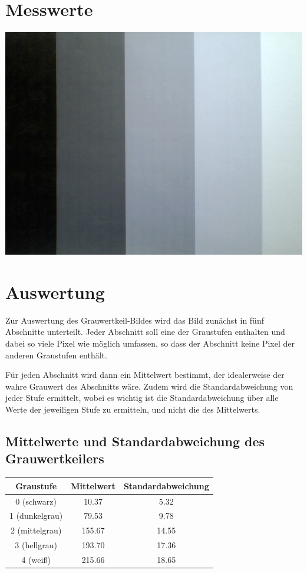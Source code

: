 \section{Messwerte}
\label{chap:VERSUCH_1_MESSWERTE}

\includegraphics[scale=0.7]{media/grauwertkeil/grauwertkeil.png}
\label{Fig:Grawertkeil}


\section{Auswertung}
\label{chap:VERSUCH_1_AUSWERTUNG}

Zur Auswertung des Grauwertkeil-Bildes wird das Bild zunächst in fünf Abschnitte unterteilt. Jeder Abschnitt soll eine der Graustufen enthalten und dabei so viele Pixel wie möglich umfassen, so dass der Abschnitt keine Pixel der anderen Graustufen enthält.

Für jeden Abschnitt wird dann ein Mittelwert bestimmt, der idealerweise der wahre Grauwert des Abschnitts wäre.
Zudem wird die Standardabweichung von jeder Stufe ermittelt, wobei es wichtig ist die Standardabweichung über alle Werte der jeweiligen Stufe zu ermitteln, und nicht die des Mittelwerts.

\subsection*{Mittelwerte und Standardabweichung des Grauwertkeilers}

\begin{tabular}{|c|c|c|}
\hline 
Graustufe & Mittelwert & Standardabweichung \\ 
\hline 
0 (schwarz) & 10.37 & 5.32 \\ 
\hline 
1 (dunkelgrau) & 79.53 & 9.78 \\ 
\hline 
2 (mittelgrau) & 155.67 & 14.55 \\ 
\hline 
3 (hellgrau) & 193.70 & 17.36 \\ 
\hline 
4 (weiß) & 215.66 & 18.65 \\ 
\hline 
\end{tabular} 

